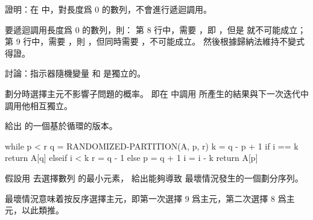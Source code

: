 \startsection[
  title={Selection in expected linear time},
]

\startEXERCISE
證明：在  中，對長度爲 0 的數列，不會進行遞迴調用。
\stopEXERCISE

\startANSWER
要遞迴調用長度爲 0 的數列，則：
\startigNum
\startitem
第 8 行中，需要 ，即 ，但是  就不可能成立；
\stopitem
\startitem
第 9 行中，需要 ，則 ，但同時需要 ，不可能成立。
\stopitem
\stopigNum
然後根據歸納法維持不變式得證。
\stopANSWER

\startEXERCISE
討論：指示器隨機變量  和  是獨立的。
\stopEXERCISE

\startANSWER
劃分時選擇主元不影響子問題的概率。
即在  中調用  所產生的結果與下一次迭代中調用他相互獨立。
\stopANSWER

\startEXERCISE
給出  的一個基於循環的版本。
\stopEXERCISE

\startANSWER
{}
\startCLRS
while p < r
	q = RANDOMIZED-PARTITION(A, p, r)
	k = q - p + 1
	if i == k
		return A[q]
	elseif i < k
		r = q - 1
	else
		p = q + 1
		i = i - k
return A[p]
\stopCLRS
\stopANSWER

\startEXERCISE
假設用  去選擇數列  的最小元素，
給出能夠導致  最壞情況發生的一個劃分序列。
\stopEXERCISE

\startANSWER
最壞情況意味着按反序選擇主元，即第一次選擇 9 爲主元，第二次選擇 8 爲主元，以此類推。
\stopANSWER

\stopsection

